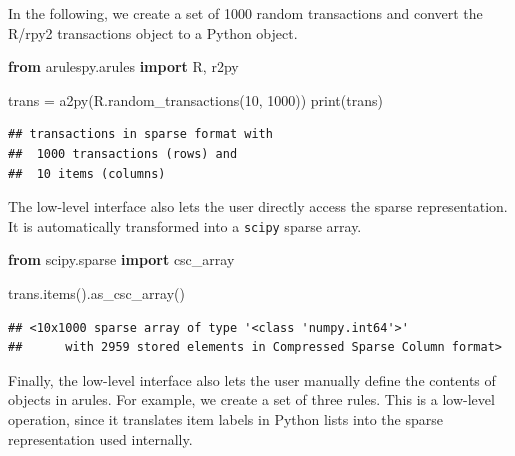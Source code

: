 \documentclass{article}
\newenvironment{Shaded}{}{}
\newcommand{\BuiltInTok}[1]{\textcolor[rgb]{0.00,0.50,0.00}{#1}}
\newcommand{\DecValTok}[1]{\textcolor[rgb]{0.25,0.63,0.44}{#1}}
\newcommand{\ImportTok}[1]{\textcolor[rgb]{0.00,0.50,0.00}{\textbf{#1}}}
\newcommand{\NormalTok}[1]{#1}
\newcommand{\OperatorTok}[1]{\textcolor[rgb]{0.40,0.40,0.40}{#1}}
\begin{document}
In the following, we create a set of 1000 random transactions and
convert the R/rpy2 transactions object to a Python object.

\begin{Shaded}
\begin{Highlighting}[]
\ImportTok{from}\NormalTok{ arulespy.arules }\ImportTok{import}\NormalTok{ R, r2py}

\NormalTok{trans }\OperatorTok{=}\NormalTok{ a2py(R.random\_transactions(}\DecValTok{10}\NormalTok{, }\DecValTok{1000}\NormalTok{))}
\BuiltInTok{print}\NormalTok{(trans)}
\end{Highlighting}
\end{Shaded}

\begin{verbatim}
## transactions in sparse format with
##  1000 transactions (rows) and
##  10 items (columns)
\end{verbatim}

The low-level interface also lets the user directly access the sparse
representation. It is automatically transformed into a \texttt{scipy}
sparse array.

\begin{Shaded}
\begin{Highlighting}[]
\ImportTok{from}\NormalTok{ scipy.sparse }\ImportTok{import}\NormalTok{ csc\_array}

\NormalTok{trans.items().as\_csc\_array()}
\end{Highlighting}
\end{Shaded}

\begin{verbatim}
## <10x1000 sparse array of type '<class 'numpy.int64'>'
##      with 2959 stored elements in Compressed Sparse Column format>
\end{verbatim}

Finally, the low-level interface also lets the user manually define the
contents of objects in arules. For example, we create a set of three
rules. This is a low-level operation, since it translates item labels in
Python lists into the sparse representation used internally.
\end{document}

